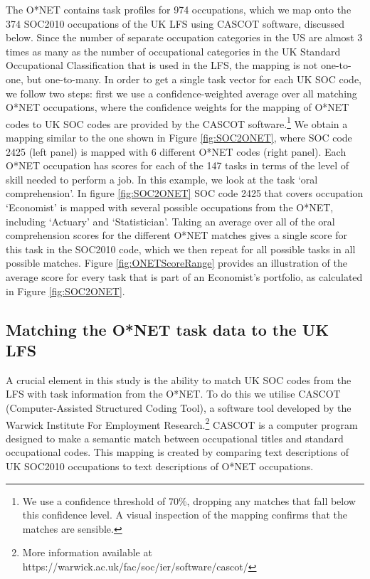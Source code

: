 \documentclass[11pt, oneside]{article}
\begin{document}
	The O*NET contains task profiles for 974 occupations, which we map onto the 374 SOC2010 occupations of the UK LFS using CASCOT software, discussed below. Since the number of separate occupation categories in the US are almost 3 times as many as the number of occupational categories in the UK Standard Occupational Classification that is used in the LFS, the mapping is not one-to-one, but one-to-many. In order to get a single task vector for each UK SOC code, we follow two steps: first we use a confidence-weighted average over all matching O*NET occupations, where the confidence weights for the mapping of O*NET codes to UK SOC codes are provided by the CASCOT software.\footnote{We use a confidence threshold of 70\%, dropping any matches that fall below this confidence level. A visual inspection of the mapping confirms that the matches are sensible.} We obtain a mapping similar to the one shown in Figure \ref{fig:SOC2ONET}, where SOC code 2425 (left panel) is mapped with 6 different O*NET codes (right panel). Each O*NET occupation has scores for each of the 147 tasks in terms of the level of skill needed to perform a job. In this example, we look at the task `oral comprehension'. In figure \ref{fig:SOC2ONET} SOC code 2425 that covers occupation `Economist' is mapped with several possible occupations from the O*NET, including `Actuary' and `Statistician'. Taking an average over all of the oral comprehension scores for the different O*NET matches gives a single score for this task in the SOC2010 code, which we then repeat for all possible tasks in all possible matches. Figure \ref{fig:ONETScoreRange} provides an illustration of the average score for every task that is part of an Economist's portfolio, as calculated in Figure \ref{fig:SOC2ONET}.
	
	
	\subsection{Matching the O*NET task data to the UK LFS}
	\label{sec:SOCdifferences}
	
	A crucial element in this study is the ability to match UK SOC codes from the LFS with task information from the O*NET. To do this we utilise CASCOT (Computer-Assisted Structured Coding Tool), a software tool developed by the Warwick Institute For Employment Research.\footnote{More information available at https://warwick.ac.uk/fac/soc/ier/software/cascot/} CASCOT is a computer program designed to make a semantic match between occupational titles and standard occupational codes. This mapping is created by comparing text descriptions of UK SOC2010 occupations to text descriptions of O*NET occupations.
	
\end{document}
